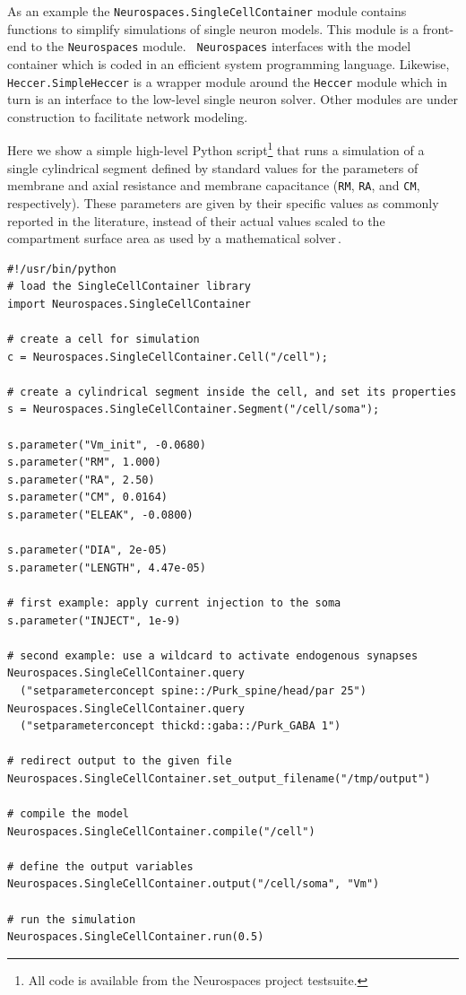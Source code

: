 \documentclass[12pt]{article}
\begin{document}
As an example the {\tt Neurospaces.SingleCellContainer} module
contains functions to simplify simulations of single neuron models.
This module is a front-end to the {\tt Neurospaces} module.  {\tt
  Neurospaces} interfaces with the model container which is coded in
an efficient system programming language.  Likewise, {\tt
  Heccer.SimpleHeccer} is a wrapper module around the {\tt Heccer}
module which in turn is an interface to the low-level single neuron
solver.  Other modules are under construction to facilitate network
modeling.

Here we show a simple high-level Python script\footnote{All code is
  available from the Neurospaces project testsuite.} that runs a
simulation of a single cylindrical segment defined by standard values
for the parameters of membrane and axial resistance and membrane
capacitance ({\tt RM}, {\tt RA},
and {\tt CM}, respectively).  These parameters are given by their
specific values as commonly reported in the literature, instead of
their actual values scaled to the compartment surface area as used by
a mathematical solver\,\cite{cornelis04:_neuros_param_handl}.

{\vspace*{1mm}
 { \footnotesize
  \linenumbers
  {\begin{verbatim}
#!/usr/bin/python
# load the SingleCellContainer library
import Neurospaces.SingleCellContainer

# create a cell for simulation
c = Neurospaces.SingleCellContainer.Cell("/cell");

# create a cylindrical segment inside the cell, and set its properties
s = Neurospaces.SingleCellContainer.Segment("/cell/soma");

s.parameter("Vm_init", -0.0680)
s.parameter("RM", 1.000)
s.parameter("RA", 2.50)
s.parameter("CM", 0.0164)
s.parameter("ELEAK", -0.0800)

s.parameter("DIA", 2e-05)
s.parameter("LENGTH", 4.47e-05)

# first example: apply current injection to the soma
s.parameter("INJECT", 1e-9)

# second example: use a wildcard to activate endogenous synapses
Neurospaces.SingleCellContainer.query
  ("setparameterconcept spine::/Purk_spine/head/par 25")
Neurospaces.SingleCellContainer.query
  ("setparameterconcept thickd::gaba::/Purk_GABA 1")

# redirect output to the given file
Neurospaces.SingleCellContainer.set_output_filename("/tmp/output")

# compile the model
Neurospaces.SingleCellContainer.compile("/cell")

# define the output variables
Neurospaces.SingleCellContainer.output("/cell/soma", "Vm")
    
# run the simulation
Neurospaces.SingleCellContainer.run(0.5)
\end{verbatim}
  \vspace*{1mm} }}}
\end{document}
